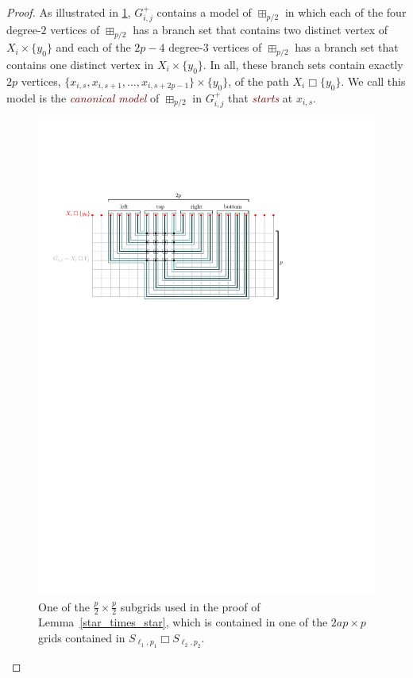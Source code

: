 \documentclass[12pt]{article}
\newcommand{\defn}[1]{\textcolor{Maroon}{\emph{#1}}}
\newcommand{\boxprod}{\mathbin{\Box}}
\theoremstyle{plain}
\theoremstyle{definition}
\begin{document}
\begin{proof}
  As illustrated in \cref{subgrid}, $G_{i,j}^+$ contains a model of $\boxplus_{p/2}$ in which each of the four degree-$2$ vertices of $\boxplus_{p/2}$ has a branch set that contains two distinct vertex of $X_i\times\{y_0\}$ and each of the $2p-4$ degree-$3$ vertices of $\boxplus_{p/2}$ has a branch set that contains one distinct vertex in $X_i\times\{y_0\}$.  In all, these branch sets contain exactly $2p$ vertices, $\{x_{i,s},x_{i,s+1},\ldots,x_{i,s+2p-1}\}\times\{y_0\}$, of the path $X_i\boxprod\{y_0\}$. We call this model is the \defn{canonical model} of $\boxplus_{p/2}$ in $G_{i,j}^+$ that \defn{starts} at $x_{i,s}$.

  \begin{figure}
    \begin{center}
      \includegraphics{subgrid}
    \end{center}
    \caption{One of the $\tfrac p2\times \tfrac p2$ subgrids used in the proof of Lemma~\ref{star_times_star}, which is contained in one of the $2ap\times p$ grids contained in $S_{\ell_1,p_1}\boxprod S_{\ell_2,p_2}$.}
    \label{subgrid}
  \end{figure}


\end{proof}
\end{document}
